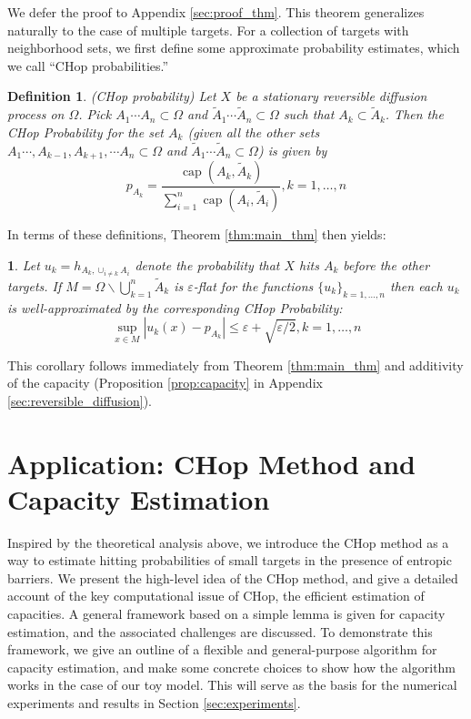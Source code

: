 \documentclass[english, aip, jcp, priprint, graphicx,floatfix]{revtex4-1}
\newtheorem{definition}{Definition}
\theoremstyle{plain}
\theoremstyle{definition}
\theoremstyle{plain}
\newtheorem{cor}[thm]{\protect\corollaryname}
\providecommand{\corollaryname}{Corollary}
\begin{document}
We defer the proof to Appendix \ref{sec:proof_thm}. This theorem generalizes naturally to the case of multiple targets.  For a collection of targets with neighborhood sets, we first define some approximate probability estimates, which we call ``CHop probabilities.''

\begin{definition}(CHop probability)
Let $X$ be a stationary reversible diffusion process on $\Omega$.  Pick $A_1\cdots A_n \subset \Omega$ and $\tilde A_1\cdots \tilde A_n \subset \Omega$ such that $A_k \subset \tilde A_k$.  Then the CHop Probability for the set $A_k$ (given all the other sets $A_1\cdots, A_{k-1}, A_{k+1}, \cdots A_n \subset \Omega$ and $\tilde A_1\cdots \tilde A_n \subset \Omega$) is given by
\begin{equation*}
p_{A_k} = \frac{\ensuremath{\operatorname{cap}} (A_k, \tilde{A}_k)}{\sum_{i = 1}^n \ensuremath{\operatorname{cap}} (A_i, \tilde{A}_i)}, k=1,\dots, n
\end{equation*} 
\end{definition}

In terms of these definitions, Theorem \ref{thm:main_thm} then yields:

\begin{cor}\label{thm:main_cor} Let $u_k = h_{A_k,\cup_{i\neq k} A_i}$ denote the probability that $X$ hits $A_k$ before the other targets. If $M = \Omega \backslash \bigcup_{k = 1}^n \tilde{A}_k $ is $\varepsilon$-flat for the functions $\{u_k\}_{k=1,\dots, n}$ then each $u_k$ is well-approximated by the corresponding CHop Probability:
\[ \sup_{x \in M} \left| u_k (x) - p_{A_k} \right| \leqslant \varepsilon + \sqrt{\varepsilon/2}, k=1,\dots, n\]
\end{cor}

This corollary follows immediately from Theorem \ref{thm:main_thm} and additivity of the capacity (Proposition \ref{prop:capacity} in Appendix \ref{sec:reversible_diffusion}). 

\section{Application: CHop Method and Capacity Estimation}\label{sec:algorithm}

Inspired by the theoretical analysis above, we introduce the CHop method as a way to estimate hitting probabilities of small targets in the presence of entropic barriers. We present the high-level idea of the CHop method, and give a detailed account of the key computational issue of CHop, the efficient estimation of capacities. A general framework based on a simple lemma is given for capacity estimation, and the associated challenges are discussed. To demonstrate this framework, we give an outline of a flexible and general-purpose algorithm for capacity estimation, and make some concrete choices to show how the algorithm works in the case of our toy model. This will serve as the basis for the numerical experiments and results in Section \ref{sec:experiments}.
\end{document}
